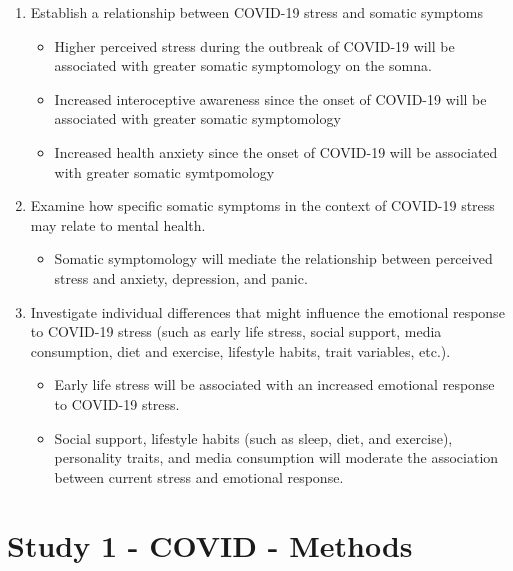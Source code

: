 \documentclass[]{book}
\providecommand{\tightlist}{%
  \setlength{\itemsep}{0pt}\setlength{\parskip}{0pt}}
\begin{document}
\begin{enumerate}
\def\labelenumi{\arabic{enumi}.}
\tightlist
\item
  Establish a relationship between COVID-19 stress and somatic symptoms

  \begin{itemize}
  \tightlist
  \item
    Higher perceived stress during the outbreak of COVID-19 will be associated with greater somatic symptomology on the somna.
  \item
    Increased interoceptive awareness since the onset of COVID-19 will be associated with greater somatic symptomology
  \item
    Increased health anxiety since the onset of COVID-19 will be associated with greater somatic symtpomology
  \end{itemize}
\item
  Examine how specific somatic symptoms in the context of COVID-19 stress may relate to mental health.

  \begin{itemize}
  \tightlist
  \item
    Somatic symptomology will mediate the relationship between perceived stress and anxiety, depression, and panic.
  \end{itemize}
\item
  Investigate individual differences that might influence the emotional response to COVID-19 stress (such as early life stress, social support, media consumption, diet and exercise, lifestyle habits, trait variables, etc.).

  \begin{itemize}
  \tightlist
  \item
    Early life stress will be associated with an increased emotional response to COVID-19 stress.
  \item
    Social support, lifestyle habits (such as sleep, diet, and exercise), personality traits, and media consumption will moderate the association between current stress and emotional response.
  \end{itemize}
\end{enumerate}

\hypertarget{study-1---covid---methods}{%
\chapter{Study 1 - COVID - Methods}\label{study-1---covid---methods}}
\end{document}
